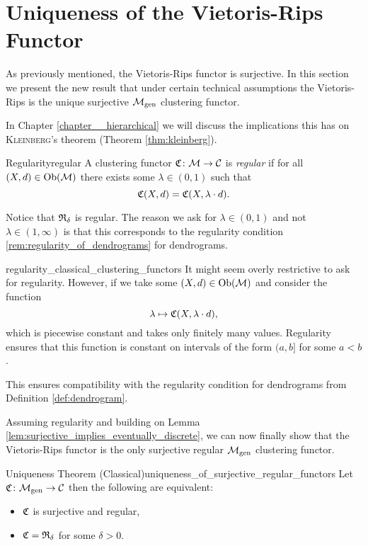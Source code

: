 \section{Uniqueness of the Vietoris-Rips Functor}

As previously mentioned, the Vietoris-Rips functor is surjective.
In this section we present the new result that under certain technical assumptions the Vietoris-Rips is the unique surjective ${\mathcal{M}_\mathrm{gen}}$ clustering functor.

In Chapter \ref{chapter__hierarchical} we will discuss the implications this has on \textsc{Kleinberg}'s theorem (Theorem \ref{thm:kleinberg}).

\begin{definition}{Regularity}{regular}
    A clustering functor $\mathfrak{C}\colon \mathcal{M} \to \mathcal{C}$ is \emph{regular} if for all $(X,d) \in \mathrm {Ob}(\mathcal{M})$ there exists some $\lambda \in (0, 1)$ such that
    $$
    \mathfrak{C}(X,d) = \mathfrak{C}(X, \lambda \cdot d).
    $$
\end{definition}

Notice that $\mathfrak{R}_\delta$ is regular. 
The reason we ask for $\lambda \in (0,1)$ and not $\lambda \in (1, \infty)$ is that this corresponds to the regularity condition \ref{rem:regularity_of_dendrograms} for dendrograms.

\begin{myremark}{}{regularity_classical_clustering_functors}
It might seem overly restrictive to ask for regularity.
However, if we take some $(X, d) \in \mathrm {Ob}(\mathcal{M})$ and consider the function 
$$
\lambda \mapsto \mathfrak{C}(X, \lambda \cdot d),
$$
which is piecewise constant and takes only finitely many values.
Regularity ensures that this function is constant on intervals of the form $(a, b]$ for some $a < b$.

This ensures compatibility with the regularity condition for dendrograms from Definition \ref{def:dendrogram}.
\end{myremark}

Assuming regularity and building on Lemma \ref{lem:surjective_implies_eventually_discrete}, we can now finally show that the Vietoris-Rips functor is the only surjective regular ${\mathcal{M}_\mathrm{gen}}$ clustering functor.

\begin{theorem}{Uniqueness Theorem (Classical)}{uniqueness_of_surjective_regular_functors}
    Let $\mathfrak{C}\colon {\mathcal{M}_\mathrm{gen}} \to \mathcal{C}$ then the following are equivalent:

    \begin{itemize}
        \item $\mathfrak{C}$ is surjective and regular,
        \item $\mathfrak{C} = \mathfrak{R}_{\delta}$ for some $\delta > 0$.
    \end{itemize}
\end{theorem}

